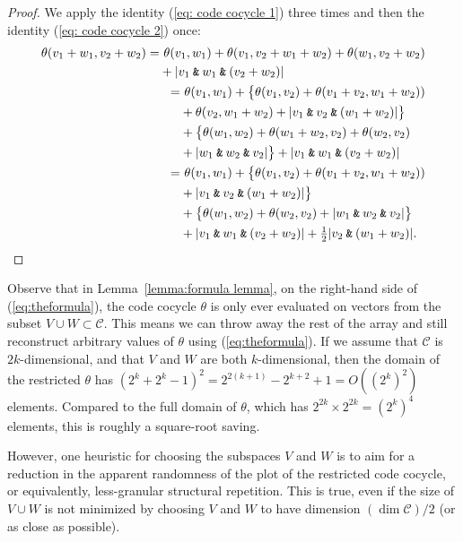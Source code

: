 \documentclass{article}
\theoremstyle{plain}
\theoremstyle{definition}
\def \cC {\mathcal{C}}
\newcommand{\AND}{\mathbin{\textup{\texttt{\&}}}}
\begin{document}
\begin{proof}
We apply the identity (\ref{eq: code cocycle 1}) three times and then the identity (\ref{eq: code cocycle 2}) once:
\begin{align*}
\begin{split}
	\theta(v_1+w_1,v_2+w_2) =&\ \theta(v_1,w_1) + \theta(v_1,v_2+w_1+w_2) + \theta(w_1,v_2+w_2) \\
	&+ |v_1\AND w_1\AND(v_2+w_2)| 
\end{split}\\
\begin{split}
	 =&\ \theta(v_1,w_1) + \big\{ \theta(v_1,v_2) + \theta(v_1+v_2,w_1+w_2)) \\ 
	 & + \theta(v_2,w_1+w_2) + |v_1\AND v_2 \AND (w_1+w_2)| \big\} \\
	 & + \big\{\theta(w_1,w_2) + \theta(w_1+w_2,v_2) + \theta(w_2,v_2) \\
	 & + |w_1\AND w_2\AND v_2| \big\} 
	  + |v_1\AND w_1\AND(v_2+w_2)| 
\end{split}\\
\begin{split}
	 =&\ \theta(v_1,w_1) + \big\{ \theta(v_1,v_2) + \theta(v_1+v_2,w_1+w_2)) \\ 
	 & +  |v_1\AND v_2 \AND (w_1+w_2)| \big\} \\
	 & + \big\{\theta(w_1,w_2) + \theta(w_2,v_2) + |w_1\AND w_2\AND v_2| \big\} \\
	 & + |v_1\AND w_1\AND(v_2+w_2)| + \tfrac12|v_2\AND (w_1+w_2)|. \qedhere
\end{split}
\end{align*}
\end{proof}



Observe that in Lemma~\ref{lemma:formula lemma}, on the right-hand side of (\ref{eq:theformula}), the code cocycle $\theta$ is only ever evaluated on vectors from the subset $V \cup W \subset \cC$.
This means we can throw away the rest of the array and still reconstruct arbitrary values of $\theta$ using (\ref{eq:theformula}).
If we assume that $\cC$ is $2k$-dimensional, and that $V$ and $W$ are both $k$-dimensional, then the domain of the restricted $\theta$ has $(2^k+2^k - 1)^2 = 2^{2(k+1)} - 2^{k+2} + 1 = O((2^k)^2)$ elements. 
Compared to the full domain of $\theta$, which has $2^{2k}\times 2^{2k} = (2^k)^4$ elements, this is roughly a square-root saving.

However, one heuristic for choosing the subspaces $V$ and $W$ is to aim for a reduction in the apparent randomness of the plot of the restricted code cocycle, or equivalently, less-granular structural repetition. 
This is true, even if the size of $V\cup W$ is not minimized by choosing $V$ and $W$ to have dimension $(\dim\cC)/2$ (or as close as possible).
\end{document}
